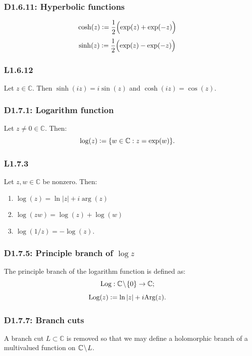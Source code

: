 \documentclass{article}
\newcommand{\deq}{\vcentcolon=}
\begin{document}
\begin{multicols*}{3}
\subsubsection*{D1.6.11: Hyperbolic functions}
$$\cosh(z)\deq\frac{1}{2}\Bigl(\exp(z)+\exp(-z)\Bigr)$$
$$\sinh(z)\deq\frac{1}{2}\Bigl(\exp(z)-\exp(-z)\Bigr)$$

\subsubsection*{L1.6.12}
Let $z\in\mathbb{C}$. Then $\sinh(iz)=i\sin(z)$
and $\cosh(iz)=\cos(z)$.

\subsubsection*{D1.7.1: Logarithm function}
Let $z\neq0\in\mathbb{C}$. Then:
$$\log(z)\deq\{w\in\mathbb{C}:z=\exp(w)\}.$$

\subsubsection*{L1.7.3}
Let $z,w\in\mathbb{C}$ be nonzero. Then:
\begin{enumerate}
    \item $\log(z)=\ln|z|+i\arg(z)$
    \item $\log(zw)=\log(z)+\log(w)$
    \item $\log(1/z)=-\log(z)$.
\end{enumerate}

\subsubsection*{D1.7.5: Principle branch of $\log z$}
The principle branch of the logarithm function
is defined as:
$$\text{Log}:\mathbb{C}\hspace{0.01in}\backslash\hspace{0.01in}\{0\}
\rightarrow\mathbb{C};$$
$$\text{Log}(z)\deq\ln|z|+i\text{Arg}(z).$$

\subsubsection*{D1.7.7: Branch cuts}
A branch cut $L\subset\mathbb{C}$ is removed
so that we may define
a holomorphic branch of a multivalued function
on $\mathbb{C}\hspace{0.01in}\backslash\hspace{0.01in}L$.


\end{multicols*}
\end{document}
